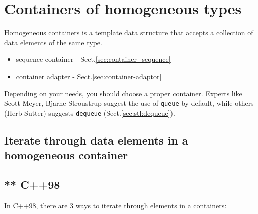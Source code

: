 \section{Containers of homogeneous types}

Homogeneous containers is a template data structure that accepts a collection of
data elements of the same type. 
\begin{itemize}
  \item sequence container - Sect.\ref{sec:container_sequence}
  \item container adapter - Sect.\ref{sec:container-adaptor}
\end{itemize}

Depending on your needs, you should choose a proper container. Experts like
Scott Meyer, Bjarne Stroustrup suggest the use of \verb!queue! by default, while
others (Herb Sutter) suggests \verb!dequeue! (Sect.\ref{sec:stl:dequeue}).

\subsection{Iterate through data elements in a homogeneous container}
\label{sec:container-homogeneous-loop-through-data}

\subsection{** C++98}

In C++98, there are 3 ways to iterate through elements in a containers: 

